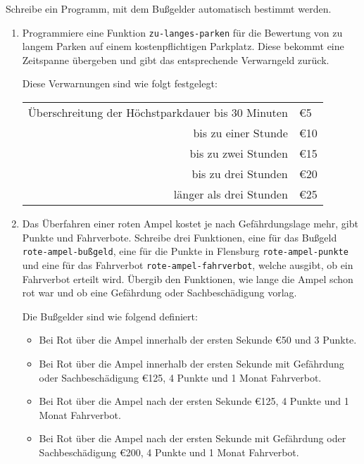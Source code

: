 \begin{aufgabe}
  Schreibe ein Programm, mit dem Bußgelder
  automatisch bestimmt werden.
  
  \begin{enumerate}
  \item Programmiere eine Funktion \lstinline{zu-langes-parken}
    für die Bewertung von zu langem Parken auf einem kostenpflichtigen
    Parkplatz. Diese bekommt eine Zeitspanne übergeben und gibt das 
    entsprechende Verwarngeld zurück.
    
    Diese Verwarnungen sind wie folgt festgelegt:
    \begin{flushleft}
      \begin{tabular}{rl}
    Überschreitung der Höchstparkdauer bis 30 Minuten & \euro{5}\\
    bis zu einer Stunde & \euro{10}\\
    bis zu zwei Stunden & \euro{15}\\
    bis zu drei Stunden & \euro{20}\\
    länger als drei Stunden &  \euro{25}
      \end{tabular}
    \end{flushleft}
    
  \item Das Überfahren einer roten Ampel kostet je nach
    Gefährdungslage mehr, gibt Punkte und Fahrverbote. Schreibe
    drei Funktionen, eine für das Bußgeld \lstinline{rote-ampel-bußgeld}, 
    eine für die Punkte in Flensburg \lstinline{rote-ampel-punkte} 
    und eine für das Fahrverbot \lstinline{rote-ampel-fahrverbot}, 
    welche ausgibt, ob ein Fahrverbot erteilt wird. Übergib
    den Funktionen, wie lange die Ampel schon rot war und ob eine
    Gefährdung oder Sachbeschädigung vorlag.
    
    Die Bußgelder sind wie folgend definiert:
    \begin{itemize}
    \item Bei Rot über die Ampel innerhalb der ersten Sekunde			
      \euro{50} und 3 Punkte.
    \item Bei Rot über die Ampel innerhalb der ersten Sekunde mit
      Gefährdung oder Sachbeschädigung \euro{125}, 4 		
      Punkte und 1 Monat Fahrverbot.
    \item Bei Rot über die Ampel nach der ersten Sekunde \euro{125},
      4 Punkte und 1 Monat Fahrverbot.
    \item Bei Rot über die Ampel nach der ersten Sekunde mit
      Gefährdung oder Sachbeschädigung \euro{200}, 4
      Punkte und 1 Monat Fahrverbot.
    \end{itemize}
    
    
  \end{enumerate}
\end{aufgabe}


